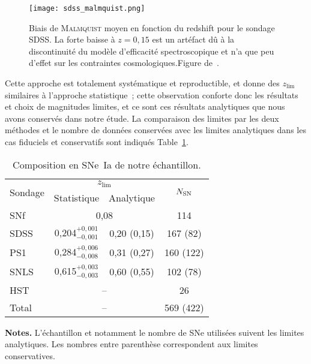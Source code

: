 \documentclass[../main/main.tex]{subfiles}
\begin{document}
\begin{SCfigure}[0.7][ht!]
    \centering
    \texttt{[image: sdss\_malmquist.png]}
    \caption[Biais de \textsc{Malmquist} moyen en fonction du redshift pour le
    sondage SDSS]{Biais de \textsc{Malmquist} moyen en fonction du redshift
        pour le sondage SDSS. La forte baisse à $z=0,15$ est un artéfact dû à la
        discontinuité du modèle d'efficacité spectroscopique et n'a que peu
        d'effet sur les contraintes cosmologiques.\smallbreak Figure
    de~\cite{conley2011}.}
    \label{fig:sdssmalm}
\end{SCfigure}

Cette approche est totalement systématique et reproductible, et donne des
$z_{\lim}$ similaires à l'approche statistique~; cette observation conforte donc
les résultats et choix de magnitudes limites, et ce sont ces résultats
analytiques que nous avons conservés dans notre étude. La comparaison des
limites par les deux méthodes et le nombre de données conservées avec les
limites analytiques dans les cas fiduciels et conservatifs sont indiqués
Table~\ref{tab:zlimsample}.

\begin{table}[ht]
    \centering
    \begin{threeparttable}
        \caption{Composition en SNe~Ia de notre échantillon.}
        \label{tab:zlimsample}
        \begin{tabular}{lccc}
            \toprule
            \multirow{2}[2]{*}{Sondage} &
            \multicolumn{2}{c}{$z_{\lim}$} &
            \multirow{2}[2]{*}{$N_{\rm SN}$}\\
            \cmidrule(lr){2-3}
            & Statistique & Analytique & \\
            \midrule
            SNf &
            \multicolumn{2}{c}{0,08} &
            114 \\
            SDSS & 
            0,204$^{+0,001}_{-0,001}$ & 0,20 (0,15) &
            167 (82) \\
            PS1 &
            0,284$^{+0,006}_{-0,008}$ & 0,31 (0,27) &
            160 (122) \\
            SNLS &
            0,615$^{+0,003}_{-0,003}$ & 0,60 (0,55) &
            102 (78) \\
            HST &
            \multicolumn{2}{c}{--} &
            26 \\
            \midrule
            Total & \multicolumn{2}{c}{--} &
            569 (422)\\
            \bottomrule
        \end{tabular}
        \begin{tablenotes}[flushleft]
        \item\small \textbf{\hspace{-3,2pt}Notes.} L'échantillon et notamment le
            nombre de SNe utilisées suivent les limites analytiques. Les nombres
            entre parenthèse correspondent aux limites conservatives.
        \end{tablenotes}
    \end{threeparttable}
\end{table}
\end{document}
